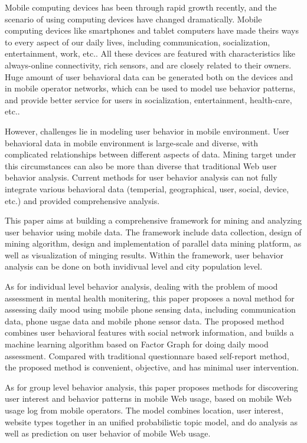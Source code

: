 \begin{eabstract} 
  Mobile computing devices has been through rapid growth recently, and the scenario of using computing devices have changed dramatically. Mobile computing devices like smartphones and tablet computers have made theirs ways to every aspect of our daily lives, including communication, socialization, entertainment, work, etc.. All these devices are featured with characteristics like always-online connectivity, rich sensors, and are closely related to their owners. Huge amount of user behavioral data can be generated both on the devices and in mobile operator networks, which can be used to model use behavior patterns, and provide better service for users in socialization, entertainment, health-care, etc..
  
  However, challenges lie in modeling user behavior in mobile environment. User behavioral data in mobile environment is large-scale and diverse, with complicated relationships between different aspects of data. Mining target under this circumstances can also be more than diverse that traditional Web user behavior analysis. Current methods for user behavior analysis can not fully integrate various behavioral data (temperial, geographical, user, social, device, etc.) and provided comprehensive analysis.

  This paper aims at building a comprehensive framework for mining and analyzing user behavior using mobile data. The framework include data collection, design of mining algorithm, design and implementation of parallel data mining platform, as well as visualization of minging results. Within the framework, user behavior analysis can be done on both invidivual level and city population level.

  As for individual level behavior analysis, dealing with the problem of mood assessment in mental health monitering, this paper proposes a noval method for assessing daily mood using mobile phone sensing data, including communication data, phone usgae data and mobile phone sensor data. The proposed method combines user behavioral features with social network information, and builds a machine learning algorithm based on Factor Graph for doing daily mood assessment. Compared with traditional questionnare based self-report method, the proposed method is convenient, objective, and has minimal user intervention. 

  As for group level behavior analysis, this paper proposes methods for discovering user interest and behavior patterns in mobile Web usage, based on mobile Web usage log from mobile operators. The model combines location, user interest, website types together in an unified probabilistic topic model, and do analysis as well as prediction on user behavior of mobile Web usage.


\end{eabstract}

